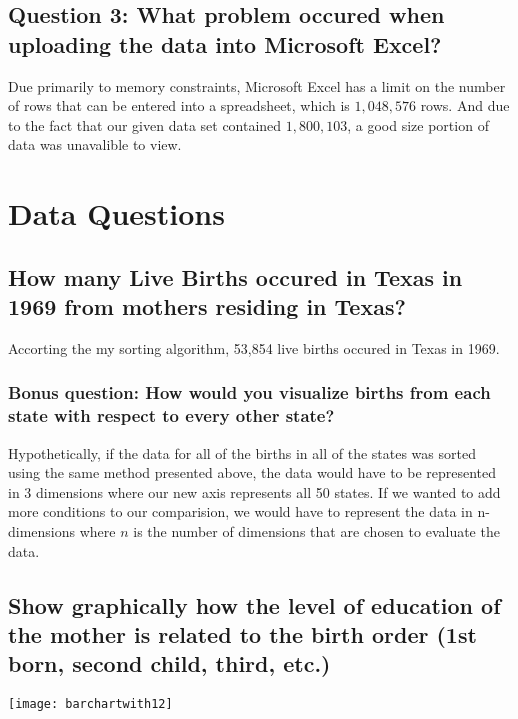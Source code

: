 \documentclass[10pt]{article}
\begin{document}
\subsection{Question 3: What problem occured when uploading the data into Microsoft Excel?}
Due primarily to memory constraints, Microsoft Excel has a limit on the number of rows that can be entered into a spreadsheet, which is $1,048,576$ rows.
And due to the fact that our given data set contained $1,800,103$, a good size portion of data was unavalible to view.
\section{Data Questions}
\subsection{How many Live Births occured in Texas in 1969 from mothers residing in Texas?}
Accorting the my sorting algorithm, 53,854 live births occured in Texas in 1969.\
\subsubsection{ Bonus question: How would you visualize births from each state with respect
to every other state?}
Hypothetically, if the data for all of the births in all of the states was sorted using the same method presented above, the data would have to be represented in 3 dimensions
where our new axis represents all 50 states. If we wanted to add more conditions to our comparision, we would have to represent the data in n-dimensions where 
$n$ is the number of dimensions that are chosen to evaluate the data.
\subsection{Show graphically how the level of education of the mother is related to the birth
order (1st born, second child, third, etc.)}
\texttt{[image: barchartwith12]}
\end{document}
